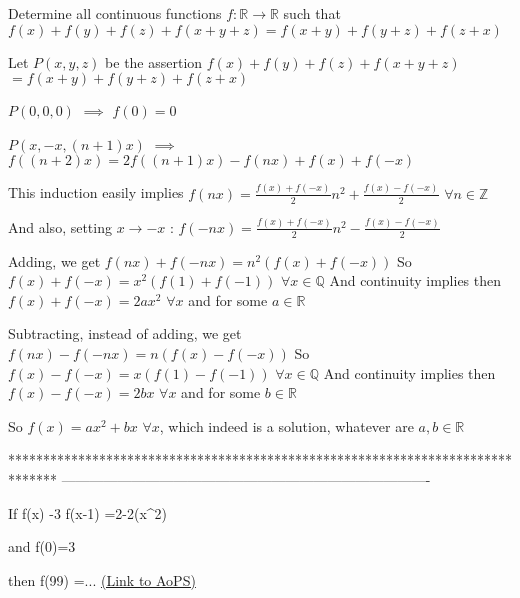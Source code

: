 \begin{solution}
	\begin{tcolorbox}Determine all continuous functions $f: \mathbb{R}\to\mathbb{R}$ such that 
$f(x)+f(y)+f(z)+f(x+y+z)=f(x+y)+f(y+z)+f(z+x)$\end{tcolorbox}
Let $P(x,y,z)$ be the assertion $f(x)+f(y)+f(z)+f(x+y+z)$ $=f(x+y)+f(y+z)+f(z+x)$

$P(0,0,0)$ $\implies$ $f(0)=0$

$P(x,-x,(n+1)x)$ $\implies$ $f((n+2)x)=2f((n+1)x)-f(nx)+f(x)+f(-x)$

This induction easily implies $f(nx)=\frac{f(x)+f(-x)}2n^2+\frac{f(x)-f(-x)}2$    $\forall n\in\mathbb Z$

And also, setting $x\to -x$ : $f(-nx)=\frac{f(x)+f(-x)}2n^2-\frac{f(x)-f(-x)}2$ 

Adding, we get $f(nx)+f(-nx)=n^2(f(x)+f(-x))$
So $f(x)+f(-x)=x^2(f(1)+f(-1))$ $\forall x\in\mathbb Q$
And continuity implies then $f(x)+f(-x)=2ax^2$ $\forall x$ and for some $a\in\mathbb R$

Subtracting, instead of adding, we get $f(nx)-f(-nx)=n(f(x)-f(-x))$
So $f(x)-f(-x)=x(f(1)-f(-1))$ $\forall x\in\mathbb Q$
And continuity implies then $f(x)-f(-x)=2bx$ $\forall x$ and for some $b\in\mathbb R$

So $\boxed{f(x)=ax^2+bx}$ $\forall x$, which indeed is a solution, whatever are $a,b\in\mathbb R$
\end{solution}
*******************************************************************************
-------------------------------------------------------------------------------

\begin{problem}
	If       f(x) -3 f(x-1) =2-2(x^2)

and f(0)=3

then f(99) =...
	\flushright \href{https://artofproblemsolving.com/community/c6h489507}{(Link to AoPS)}
\end{problem}



